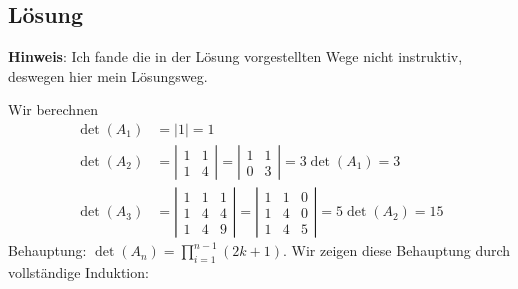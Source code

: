 \subsection{Lösung}
\begin{remark}
	\textbf{Hinweis}: Ich fande die in der Lösung vorgestellten Wege nicht instruktiv, deswegen hier mein Lösungsweg.
\end{remark}
Wir berechnen
\begin{align*}
	\det(A_1) &= |1| = 1 \\
	\det(A_2) &= \left| \begin{smallmatrix}
		1 & 1 \\
		1 & 4
	\end{smallmatrix} \right| = \left| \begin{smallmatrix}
		1 & 1 \\
		0 & 3
	\end{smallmatrix} \right| = 3 \det(A_1) = 3 \\
	\det(A_3) &= \left| \begin{smallmatrix}
		1 & 1 & 1 \\
		1 & 4 & 4 \\
		1 & 4 & 9
	\end{smallmatrix} \right| = \left| \begin{smallmatrix}
		1 & 1 & 0 \\
		1 & 4 & 0 \\
		1 & 4 & 5
	\end{smallmatrix} \right| = 5 \det(A_2) = 15
\end{align*}
Behauptung: \( \det(A_n) = \prod_{i=1}^{n-1}(2k+1) \). Wir zeigen diese Behauptung durch vollständige Induktion:
